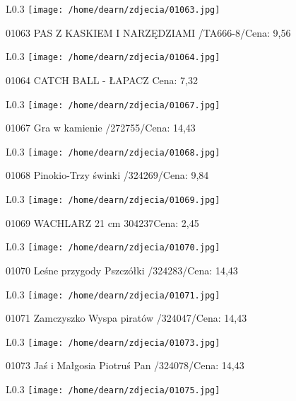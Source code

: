 \begin{wrapfigure}{L}{0.3\textwidth}
\texttt{[image: /home/dearn/zdjecia/01063.jpg]}
\end{wrapfigure}
01063 PAS Z KASKIEM I NARZĘDZIAMI /TA666-8/Cena: 9,56\newline
\begin{wrapfigure}{L}{0.3\textwidth}
\texttt{[image: /home/dearn/zdjecia/01064.jpg]}
\end{wrapfigure}
01064 CATCH BALL - ŁAPACZ Cena: 7,32\newline
\begin{wrapfigure}{L}{0.3\textwidth}
\texttt{[image: /home/dearn/zdjecia/01067.jpg]}
\end{wrapfigure}
01067 Gra w kamienie /272755/Cena: 14,43\newline
\begin{wrapfigure}{L}{0.3\textwidth}
\texttt{[image: /home/dearn/zdjecia/01068.jpg]}
\end{wrapfigure}
01068 Pinokio-Trzy świnki /324269/Cena: 9,84\newline
\begin{wrapfigure}{L}{0.3\textwidth}
\texttt{[image: /home/dearn/zdjecia/01069.jpg]}
\end{wrapfigure}
01069 WACHLARZ 21 cm 304237Cena: 2,45\newline
\begin{wrapfigure}{L}{0.3\textwidth}
\texttt{[image: /home/dearn/zdjecia/01070.jpg]}
\end{wrapfigure}
01070 Leśne przygody Pszczółki /324283/Cena: 14,43\newline
\begin{wrapfigure}{L}{0.3\textwidth}
\texttt{[image: /home/dearn/zdjecia/01071.jpg]}
\end{wrapfigure}
01071 Zamczyszko Wyspa piratów /324047/Cena: 14,43\newline
\begin{wrapfigure}{L}{0.3\textwidth}
\texttt{[image: /home/dearn/zdjecia/01073.jpg]}
\end{wrapfigure}
01073 Jaś i Małgosia Piotruś Pan  /324078/Cena: 14,43\newline
\begin{wrapfigure}{L}{0.3\textwidth}
\texttt{[image: /home/dearn/zdjecia/01075.jpg]}
\end{wrapfigure}
